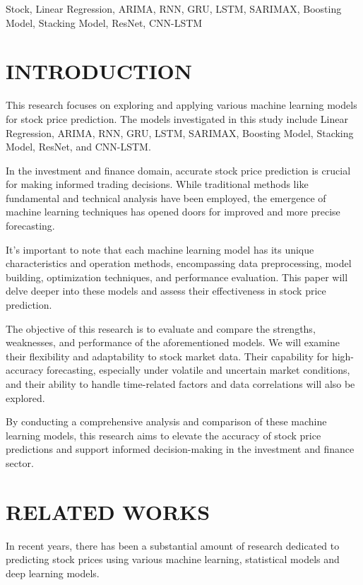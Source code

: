 \documentclass[conference]{IEEEtran}
\begin{document}
\begin{IEEEkeywords}
Stock, Linear Regression, ARIMA, RNN, GRU, LSTM, SARIMAX, Boosting Model, Stacking Model, ResNet, CNN-LSTM
\end{IEEEkeywords}

\section{INTRODUCTION}
This research focuses on exploring and applying various machine learning models for stock price prediction. The models investigated in this study include Linear Regression, ARIMA, RNN, GRU, LSTM, SARIMAX, Boosting Model, Stacking Model, ResNet, and CNN-LSTM.

In the investment and finance domain, accurate stock price prediction is crucial for making informed trading decisions. While traditional methods like fundamental and technical analysis have been employed, the emergence of machine learning techniques has opened doors for improved and more precise forecasting.

It's important to note that each machine learning model has its unique characteristics and operation methods, encompassing data preprocessing, model building, optimization techniques, and performance evaluation. This paper will delve deeper into these models and assess their effectiveness in stock price prediction.

The objective of this research is to evaluate and compare the strengths, weaknesses, and performance of the aforementioned models. We will examine their flexibility and adaptability to stock market data. Their capability for high-accuracy forecasting, especially under volatile and uncertain market conditions, and their ability to handle time-related factors and data correlations will also be explored.

By conducting a comprehensive analysis and comparison of these machine learning models, this research aims to elevate the accuracy of stock price predictions and support informed decision-making in the investment and finance sector.

\section{RELATED WORKS}

In recent years, there has been a substantial amount of research dedicated to predicting stock prices using various machine learning, statistical models and deep learning models.
\end{document}
